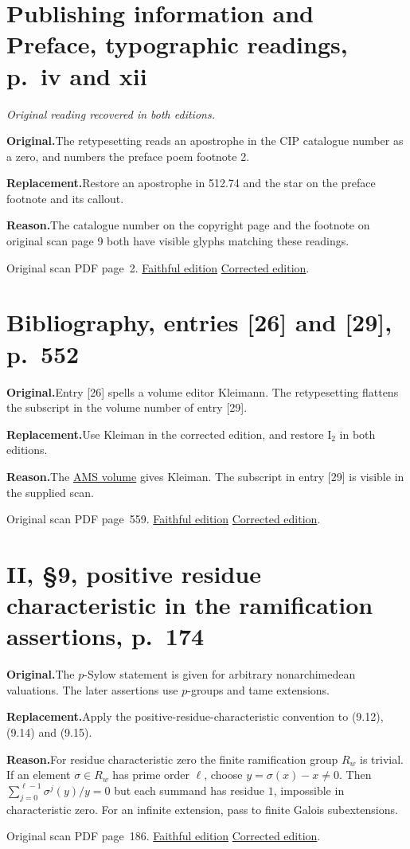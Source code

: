 \documentclass[11pt,a4paper]{article}
\newcommand{\original}{\par\smallskip\noindent\textbf{Original.}\enspace}
\newcommand{\replacement}{\par\smallskip\noindent\textbf{Replacement.}\enspace}
\newcommand{\reason}{\par\smallskip\noindent\textbf{Reason.}\enspace}
\newcommand{\editionlink}[3]{\href{#1\#errata.#2}{#3}}
\newcommand{\location}[2]{%
  \par\smallskip\noindent Original scan PDF page~#2.\enspace
  \editionlink{Neukirch_Faithful.pdf}{#1}{Faithful edition}
  \quad\editionlink{Neukirch_Corrected.pdf}{#1}{Corrected edition}.}
\begin{document}
\setcounter{section}{212}
\section{Publishing information and Preface, typographic readings, p.~iv and xii}\label{errata:item:213}
\noindent\emph{Original reading recovered in both editions.}\par
\original The retypesetting reads an apostrophe in the CIP catalogue number as a zero, and numbers the preface poem footnote 2.
\replacement Restore an apostrophe in \mbox{512\textquotesingle.74} and the star on the preface footnote and its callout.
\reason The catalogue number on the copyright page and the footnote on original scan page 9 both have visible glyphs matching these readings.
\location{213}{2}

\setcounter{section}{213}
\section{Bibliography, entries [26] and [29], p.~552}\label{errata:item:214}

\original Entry [26] spells a volume editor Kleimann. The retypesetting flattens the subscript in the volume number of entry [29].
\replacement Use Kleiman in the corrected edition, and restore $\mathrm I_2$ in both editions.
\reason The \href{https://www.ams.org/books/pspum/055.1/pspum055.1-endmatter.pdf}{AMS volume} gives Kleiman. The subscript in entry [29] is visible in the supplied scan.
\location{214}{559}

\setcounter{section}{214}
\section{II, \S9, positive residue characteristic in the ramification assertions, p.~174}\label{errata:item:215}

\original The $p$-Sylow statement is given for arbitrary nonarchimedean valuations. The later assertions use $p$-groups and tame extensions.
\replacement Apply the positive-residue-characteristic convention to (9.12), (9.14) and (9.15).
\reason For residue characteristic zero the finite ramification group $R_w$ is trivial. If an element $\sigma\in R_w$ has prime order $\ell$, choose $y=\sigma(x)-x\ne0$. Then $\sum_{j=0}^{\ell-1}\sigma^j(y)/y=0$ but each summand has residue $1$, impossible in characteristic zero. For an infinite extension, pass to finite Galois subextensions.
\location{215}{186}

\setcounter{section}{215}
\end{document}
